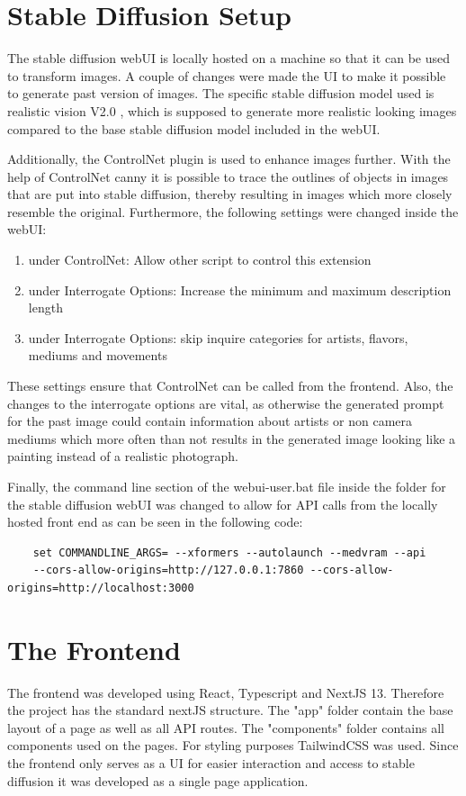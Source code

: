 \documentclass[english,notitlepage,smartquotes]{hgbreport}
\begin{document}
\section{Stable Diffusion Setup}
The stable diffusion webUI \cite{webui} is locally hosted on a machine so that it can be used to transform images. A couple of changes were made the UI to make it possible to generate past version of images.
The specific stable diffusion model used is realistic vision V2.0 \cite{realisticVision}, which is supposed to generate more realistic looking images compared to the base stable diffusion model included in the webUI.

Additionally, the ControlNet plugin \cite{controllNet} is used to enhance images further. With the help of ControlNet canny it is possible to trace the outlines of objects in images that are put into stable diffusion, thereby resulting in images which more closely resemble the original.
Furthermore, the following settings were changed inside the webUI:
\begin{enumerate}
    \item under ControlNet: Allow other script to control this extension
    \item under Interrogate Options: Increase the minimum and maximum description length 
    \item under Interrogate Options: skip inquire categories for artists, flavors, mediums and movements 
\end{enumerate}
These settings ensure that ControlNet can be called from the frontend. Also, the changes to the interrogate options are vital, as otherwise the generated prompt for the past image could contain information about artists or non camera mediums which more often than not results in the generated image looking like a painting instead of a realistic photograph.

Finally, the command line section of the webui-user.bat file inside the folder for the stable diffusion webUI was changed to allow for API calls from the locally hosted front end as can be seen in the following code:

\begin{verbatim}
    set COMMANDLINE_ARGS= --xformers --autolaunch --medvram --api 
    --cors-allow-origins=http://127.0.0.1:7860 --cors-allow-origins=http://localhost:3000
\end{verbatim}

\section{The Frontend}
The frontend was developed using React, Typescript and NextJS 13. Therefore the project has the standard nextJS structure. The "app" folder contain the base layout of a page as well as all API routes. The "components" folder contains all components used on the pages. For styling purposes TailwindCSS was used. Since the frontend only serves as a UI for easier interaction and access to stable diffusion it was developed as a single page application.
\end{document}
